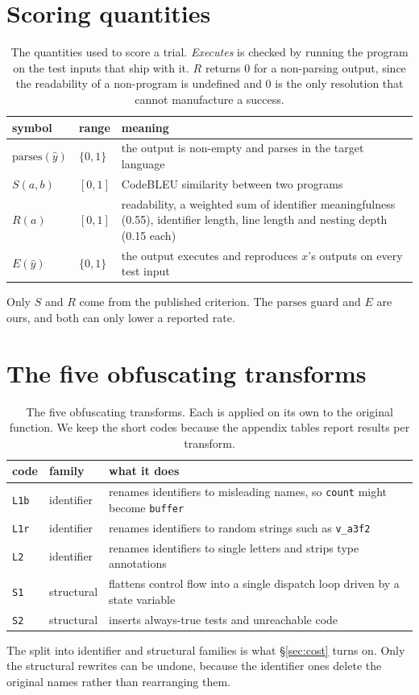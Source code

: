 \documentclass{article}
\newcommand{\arm}[1]{\texttt{#1}}
\begin{document}
\section{Scoring quantities}
\label{app:metrics}
\begin{table}[h]
\centering\footnotesize
\caption{The quantities used to score a trial. \emph{Executes} is checked by running the
program on the test inputs that ship with it. $R$ returns 0 for a non-parsing output, since
the readability of a non-program is undefined and 0 is the only resolution that cannot
manufacture a success.}
\label{tab:metrics}
\begin{tabular}{llp{6.7cm}}
\toprule
symbol & range & meaning \\
\midrule
$\mathrm{parses}(\hat y)$ & $\{0,1\}$ & the output is non-empty and parses in the target
language \\
$S(a,b)$ & $[0,1]$ & CodeBLEU similarity between two programs
\citep{ren2020codebleu} \\
$R(a)$ & $[0,1]$ & readability, a weighted sum of identifier meaningfulness (0.55),
identifier length, line length and nesting depth (0.15 each) \\
$E(\hat y)$ & $\{0,1\}$ & the output executes and reproduces $x$'s outputs on every test input \\
\bottomrule
\end{tabular}
\end{table}
Only $S$ and $R$ come from the published criterion. The $\mathrm{parses}$ guard and $E$ are
ours, and both can only lower a reported rate.

\section{The five obfuscating transforms}
\label{app:conditions}
\begin{table}[h]
\centering\small
\caption{The five obfuscating transforms. Each is applied on its own to the original
function. We keep the short codes because the appendix tables report results per
transform.}
\label{tab:conditions}
\begin{tabular}{llp{7.1cm}}
\toprule
code & family & what it does \\
\midrule
\arm{L1b} & identifier & renames identifiers to misleading names, so \texttt{count} might
become \texttt{buffer} \\
\arm{L1r} & identifier & renames identifiers to random strings such as \texttt{v\_a3f2} \\
\arm{L2} & identifier & renames identifiers to single letters and strips type annotations \\
\arm{S1} & structural & flattens control flow into a single dispatch loop driven by a state
variable \\
\arm{S2} & structural & inserts always-true tests and unreachable code \\
\bottomrule
\end{tabular}
\end{table}
The split into identifier and structural families is what \S\ref{sec:cost} turns on. Only the
structural rewrites can be undone, because the identifier ones delete the original names
rather than rearranging them.
\end{document}
